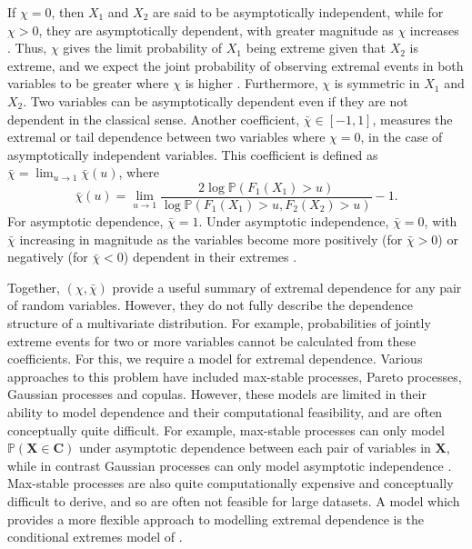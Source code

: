 \documentclass{article}
\numberwithin{equation}{section}
\begin{document}
If $\chi = 0$, then $X_1$ and $X_2$ are said to be asymptotically independent, while for $\chi > 0$, they are asymptotically dependent, with greater magnitude as $\chi$ increases \citep{Coles1999}.
Thus, $\chi$ gives the limit probability of $X_1$ being extreme given that $X_2$ is extreme, and we expect the joint probability of observing extremal events in both variables to be greater where $\chi$ is higher \citep{Rohrbeck2021}.
Furthermore, $\chi$ is symmetric in $X_1$ and $X_2$.
Two variables can be asymptotically dependent even if they are not dependent in the classical sense.
Another coefficient, $\bar{\chi} \in [-1, 1]$, measures the extremal or tail dependence between two variables where $\chi = 0$, in the case of asymptotically independent variables.
This coefficient is defined as $\bar{\chi} = \lim_{u \rightarrow 1}{\bar{\chi}(u)}$, where
\[
  \bar{\chi}(u) = \lim_{u \rightarrow 1} \frac{2\log\mathbb{P}(F_1(X_1) > u)}{ \log{\mathbb{P}(F_1(X_1) > u, F_2(X_2) > u)}} - 1.
\]
For asymptotic dependence, $\bar{\chi} = 1$.
Under asymptotic independence, $\bar{\chi} = 0$, with $\bar{\chi}$ increasing in magnitude as the variables become more positively (for $\bar{\chi} > 0$) or negatively (for $\bar{\chi} < 0$) dependent in their extremes \citep{Vignotto2021}.


Together, $(\chi, \bar{\chi})$ provide a useful summary of extremal dependence for any pair of random variables.
However, they do not fully describe the dependence structure of a multivariate distribution.
For example, probabilities of jointly extreme events for two or more variables cannot be calculated from these coefficients.
For this, we require a model for extremal dependence.
Various approaches to this problem have included max-stable processes, Pareto processes, Gaussian processes and copulas.
However, these models are limited in their ability to model dependence and their computational feasibility, and are often conceptually quite difficult. 
For example, max-stable processes can only model $\mathbb{P}(\bm{X} \in \bm{C})$ under asymptotic dependence between each pair of variables in $\bm{X}$, while in contrast Gaussian processes can only model asymptotic independence \citep{Tawn2018, Huser2024}.
Max-stable processes are also quite computationally expensive and conceptually difficult to derive, and so are often not feasible for large datasets.
A model which provides a more flexible approach to modelling extremal dependence is the conditional extremes model of \citet{Heffernan2004}.
\end{document}
